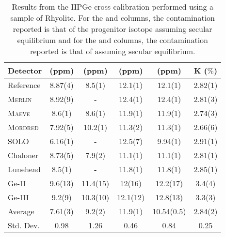 \begin{table}[t!]
\centering
\vspace{-5mm}
\caption{Results from the HPGe cross-calibration performed using a sample of Rhyolite. For the \utTeE{} and \utTeL{} columns, the contamination reported is that of the progenitor isotope \utTe{} assuming secular equilibrium and for the \thtTtE{} and \thtTtL{} columns, the contamination reported is that of \thtTt{} assuming secular equilibrium.}
    \label{tab:GeCrossCal}
    \renewcommand{\arraystretch}{1.1}
    \begin{tabular}{lccccc}
    \toprule
    
    \textbf{Detector} & %
    \textbf{\utTeE{} (ppm)}  & %
    \textbf{\utTeL{} (ppm)} &  %
    \textbf{\thtTtE{} (ppm)} &  %
    \textbf{\thtTtL{} (ppm)}  & %
    \textbf{K ($\%$)}   \\  %
    
    \hline
    \hline
    
    Reference & 8.87(4) & 8.5(1) & 12.1(1) & 12.1(1) & 2.82(1) \\
    
    \hline
   
    \textsc{Merlin} & 8.92(9) & - & 12.4(1) & 12.4(1) & 2.81(3) \\
    \textsc{Maeve} & 8.6(1) & 8.6(1) & 11.9(1) & 11.9(1) & 2.74(3) \\
    \textsc{Mordred} & 7.92(5) & 10.2(1) & 11.3(2) & 11.3(1) & 2.66(6) \\
    SOLO & 6.16(1) & - & 12.5(7) & 9.94(1) & 2.91(1) \\
    Chaloner & 8.73(5) & 7.9(2) & 11.1(1) & 11.1(1) & 2.81(1) \\
    Lunehead & 8.5(1) & - & 11.8(1) & 11.8(1) & 2.85(1) \\
    Ge-II & 9.6(13) & 11.4(15) & 12(16) & 12.2(17) & 3.4(4) \\
    Ge-III & 9.2(9) & 10.3(10) & 12.1(12) & 12.8(13) & 3.3(3) \\
   
    \hline
   
    Average & 7.61(3) & 9.2(2) & 11.9(1) & 10.54(0.5) & 2.84(2) \\
    Std. Dev. & 0.98 & 1.26 & 0.46 & 0.84 & 0.25 \\
    
    \bottomrule
\end{tabular}
\end{table}